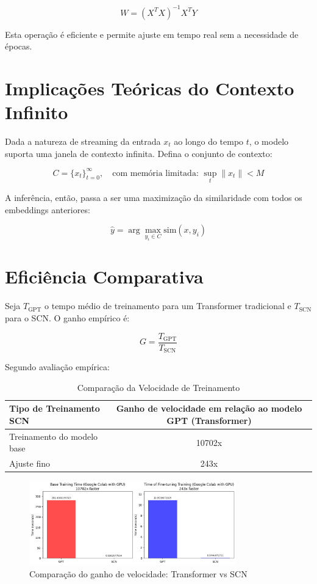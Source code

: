 \documentclass[11pt]{article}
\begin{document}
\begin{equation}
W = (X^T X)^{-1} X^T Y
\end{equation}

Esta operação é eficiente e permite ajuste em tempo real sem a necessidade de épocas.

\section{Implicações Teóricas do Contexto Infinito}
Dada a natureza de streaming da entrada $x_t$ ao longo do tempo $t$, o modelo suporta uma janela de contexto infinita. Defina o conjunto de contexto:

\begin{equation}
C = \{ x_t \}_{t=0}^{\infty}, \quad \text{com memória limitada: } \sup_t \|x_t\| < M
\end{equation}

A inferência, então, passa a ser uma maximização da similaridade com todos os embeddings anteriores:

\begin{equation}
\hat{y} = \arg\max_{y_i \in C} \text{sim}(x, y_i)
\end{equation}

\section{Eficiência Comparativa}
Seja $T_{\text{GPT}}$ o tempo médio de treinamento para um Transformer tradicional e $T_{\text{SCN}}$ para o SCN. O ganho empírico é:

\begin{equation}
G = \frac{T_{\text{GPT}}}{T_{\text{SCN}}}
\end{equation}

Segundo avaliação empírica:
\begin{table}[H]
\centering
\caption{Comparação da Velocidade de Treinamento}
\begin{tabular}{|l|c|}
\hline
\textbf{Tipo de Treinamento SCN} & \textbf{Ganho de velocidade em relação ao modelo GPT (Transformer)} \\
\hline
Treinamento do modelo base & 10702x \\
Ajuste fino & 243x \\
\hline
\end{tabular}
\end{table}

\begin{figure}[H]
    \centering
    \includegraphics[width=0.8\textwidth]{gpt_vs_scn.png}
    \caption{Comparação do ganho de velocidade: Transformer vs SCN}
\end{figure}
\end{document}
